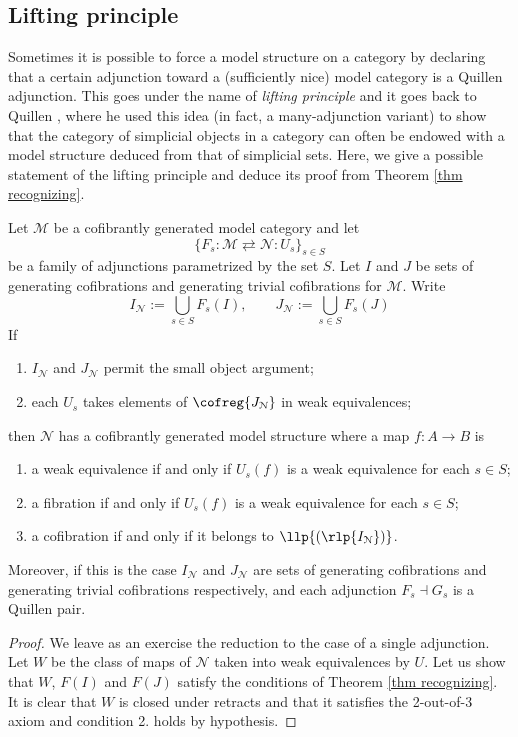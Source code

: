 \begin{refsection}
\subsection{Lifting principle}

Sometimes it is possible to force a model structure on a category by declaring that a certain adjunction toward a (sufficiently nice) model category is a Quillen adjunction. This goes under the name of \emph{lifting principle} and it goes back to Quillen \cite{quillen}, where he used this idea (in fact, a many-adjunction variant) to show that the category of simplicial objects in a category can often be endowed with a model structure deduced from that of simplicial sets. Here, we give a possible statement of the lifting principle and deduce its proof from Theorem \ref{thm recognizing}.

\begin{thm} \label{thm lifting}
Let $\mathcal M$ be a cofibrantly generated model category and let
\[
\{F_s \colon \mathcal M \rightleftarrows \mathcal N \colon U_s\}_{s \in S}
\]
be a family of adjunctions parametrized by the set $S$. Let $I$ and $J$ be sets of generating cofibrations and generating trivial cofibrations for $\mathcal M$. Write
\[
I_{\mathcal N} := \bigcup_{s \in S} F_s(I), \qquad J_{\mathcal N} := \bigcup_{s \in S} F_s(J)
\]
If
\begin{enumerate}
\item $I_{\mathcal N}$ and $J_{\mathcal N}$ permit the small object argument;
\item each $U_s$ takes elements of $\cofreg{J_{\mathcal N}}$ in weak equivalences;
\end{enumerate}
then $\mathcal N$ has a cofibrantly generated model structure where a map $f \colon A \to B$ is
\begin{enumerate}
\item a weak equivalence if and only if $U_s(f)$ is a weak equivalence for each $s \in S$;
\item a fibration if and only if $U_s(f)$ is a weak equivalence for each $s \in S$;
\item a cofibration if and only if it belongs to $\llp{(\rlp{I_{\mathcal N}})}$.
\end{enumerate}
Moreover, if this is the case $I_{\mathcal N}$ and $J_{\mathcal N}$ are sets of generating cofibrations and generating trivial cofibrations respectively, and each adjunction $F_s \dashv G_s$ is a Quillen pair.
\end{thm}

\begin{proof}
We leave as an exercise the reduction to the case of a single adjunction. Let $W$ be the class of maps of $\mathcal N$ taken into weak equivalences by $U$. Let us show that $W$, $F(I)$ and $F(J)$ satisfy the conditions of Theorem \ref{thm recognizing}. It is clear that $W$ is closed under retracts and that it satisfies the 2-out-of-3 axiom and condition 2. holds by hypothesis.


\end{proof}
\end{refsection}
